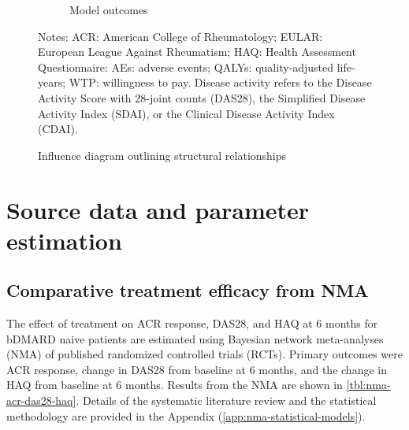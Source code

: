 \documentclass[11pt,final,fleqn]{article}\usepackage[]{graphicx}\usepackage[]{color}
\theoremstyle{plain}
\begin{document}
\begin{figure}
\begin{subfigure}{\textwidth}
\caption{Model outcomes} \label{subfig:model-outcomes}
\end{subfigure}
\caption{Influence diagram outlining structural relationships}\label{fig:influence-diagram}
\begin{minipage}{\linewidth}
\footnotesize
Notes: ACR: American College of Rheumatology; EULAR: European League Against Rheumatism; HAQ: Health Assessment Questionnaire: AEs: adverse events; QALYs: quality-adjusted life-years; WTP: willingness to pay. Disease activity refers to the Disease Activity Score with 28-joint counts (DAS28), the Simplified Disease Activity Index (SDAI), or the Clinical Disease Activity Index (CDAI).
\end{minipage}
\end{figure}

\section{Source data and parameter estimation}\label{sec:data-parameters}

\subsection{Comparative treatment efficacy from NMA}\label{nma-parameters}
The effect of treatment on ACR response, DAS28, and HAQ at 6 months for bDMARD naive patients are estimated using Bayesian network meta-analyses (NMA) of published randomized controlled trials (RCTs). Primary outcomes were ACR response, change in DAS28 from baseline at 6 months, and the change in HAQ from baseline at 6 months. Results from the NMA are shown in \autoref{tbl:nma-acr-das28-haq}. Details of the systematic literature review and the statistical methodology are provided in the Appendix (\autoref{app:nma-statistical-models}).
\end{document}
